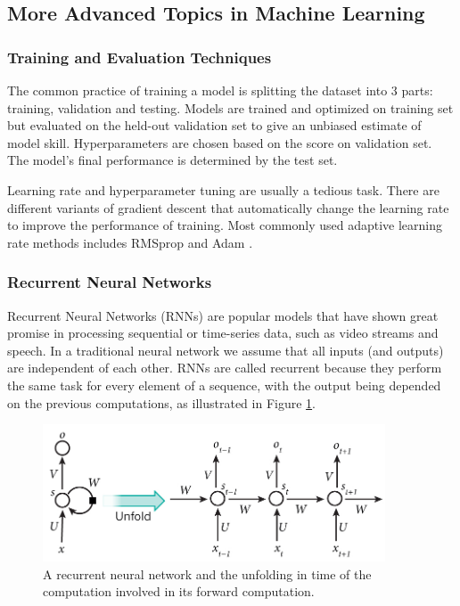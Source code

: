 \documentclass[twoside]{article}
\begin{document}
\subsection{More Advanced Topics in Machine Learning}

\subsubsection*{Training and Evaluation Techniques}

The common practice of training a model is splitting the dataset into 3 parts: training, validation and testing. Models are trained and optimized on training set but evaluated on the held-out validation set to give an unbiased estimate of model skill. Hyperparameters are chosen based on the score on validation set. The model's final performance is determined by the test set. 

Learning rate and hyperparameter tuning are usually a tedious task. There are different variants of gradient descent that automatically change the learning rate to improve the performance of training. Most commonly used adaptive learning rate methods includes RMSprop \cite{Tieleman2012} and Adam \cite{kingma2014adam}.

\subsubsection*{Recurrent Neural Networks}

Recurrent Neural Networks (RNNs) are popular models that have shown great promise in processing sequential or time-series data, such as video streams and speech.  In a traditional neural network we assume that all inputs (and outputs) are independent of each other. RNNs are called recurrent because they perform the same task for every element of a sequence, with the output being depended on the previous computations, as illustrated in Figure \ref{fig:rnn}. 

\begin{figure}[!htp]
\centering
\includegraphics[width=4in]{img/rnn.jpg}
\caption{A recurrent neural network and the unfolding in time of the computation involved in its forward computation.}
\label{fig:rnn}
\end{figure}
\end{document}
